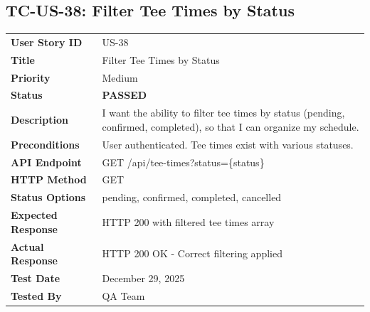 \documentclass[11pt,a4paper]{article}
\newcommand{\passed}{\textcolor{pass}{\textbf{PASSED}}}
\begin{document}
\vspace{0.5cm}


\subsection{TC-US-38: Filter Tee Times by Status}

\begin{tabularx}{\textwidth}{|p{3.2cm}|Y|}
\hline
{}
 \\
\hline
\textbf{User Story ID} & US-38 \\
\hline
\textbf{Title} & Filter Tee Times by Status \\
\hline
\textbf{Priority} & Medium \\
\hline
\textbf{Status} & \passed \\
\hline
\textbf{Description} & I want the ability to filter tee times by status (pending, confirmed, completed), so that I can organize my schedule. \\
\hline
\textbf{Preconditions} & User authenticated. Tee times exist with various statuses. \\
\hline
\textbf{API Endpoint} & GET /api/tee-times?status=\{status\} \\
\hline
\textbf{HTTP Method} & GET \\
\hline
\textbf{Status Options} & pending, confirmed, completed, cancelled \\
\hline
\textbf{Expected Response} & HTTP 200 with filtered tee times array \\
\hline
\textbf{Actual Response} & HTTP 200 OK - Correct filtering applied \\
\hline
\textbf{Test Date} & December 29, 2025 \\
\hline
\textbf{Tested By} & QA Team \\
\hline
\end{tabularx}
\end{document}
